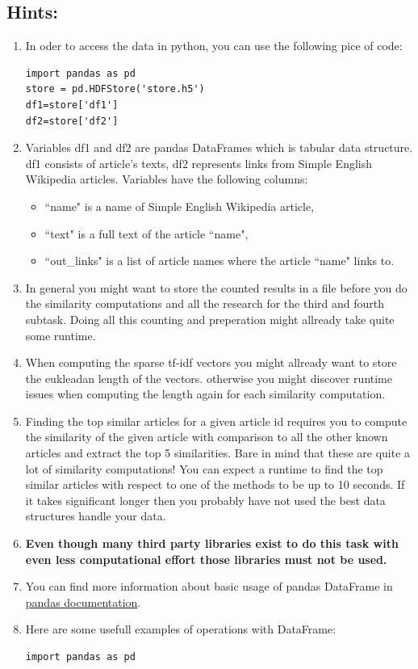 \documentclass{WeSTassignment}
\begin{document}
\subsection{Hints:}
\begin{enumerate}
\item In oder to access the data in python, you can use the following pice of code:
\begin{verbatim} 
import pandas as pd
store = pd.HDFStore('store.h5')
df1=store['df1'] 
df2=store['df2'] 
\end{verbatim}
\item Variables df1 and df2 are pandas DataFrames which is tabular data structure. df1 consists of article's texts, df2 represents links from Simple English Wikipedia articles. Variables have the following columns:
\begin{itemize}
\item ``name" is a name of Simple English Wikipedia article,
\item ``text" is a full text of the article ``name",
\item ``out\_links" is a list of article names where the article ``name" links to.
\end{itemize}
\item In general you might want to store the counted results in a file before you do the similarity computations and all the research for the third and fourth subtask. Doing all this counting and preperation might allready take quite some runtime. 
\item When computing the sparse tf-idf vectors you might allready want to store the eukleadan length of the vectors. otherwise you might discover runtime issues when computing the length again for each similarity computation. 
\item Finding the top similar articles for a given article id requires you to compute the similarity of the given article with comparison to all the other known articles and extract the top 5 similarities. Bare in mind that these are quite a lot of similarity computations! You can expect a runtime to find the top similar articles with respect to one of the methods to be up to 10 seconds. If it takes significant longer then you probably have not used the best data structures handle your data.
\item \textbf{Even though many third party libraries exist to do this task with even less computational effort those libraries must not be used.}
\item You can find more information about basic usage of pandas DataFrame in  \href{http://pandas.pydata.org/pandas-docs/stable/dsintro.html#column-selection-addition-deletion}{pandas documentation}.
\item Here are some usefull examples of operations with DataFrame:
\begin{verbatim} 
import pandas as pd


\end{verbatim}
\end{enumerate}
\end{document}

